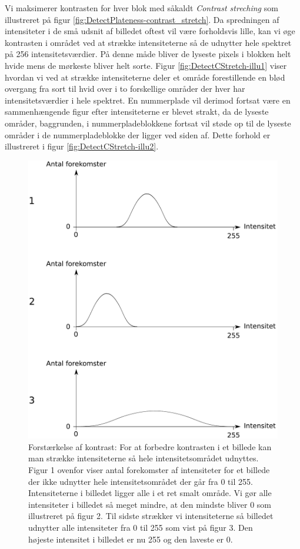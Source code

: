 Vi maksimerer kontrasten for hver blok med såkaldt \textit{Contrast streching} som illustreret på figur \vref{fig:DetectPlateness-contrast_stretch}. Da spredningen af intensiteter i de små udsnit af billedet oftest vil være forholdsvis lille, kan vi øge kontrasten i området ved at strække intensiteterne så de udnytter hele spektret på 256 intensitetsværdier. På denne måde bliver de lyseste pixels i blokken helt hvide  mens de mørkeste bliver helt sorte. Figur \vref{fig:DetectCStretch-illu1} viser hvordan vi ved at strække intensiteterne deler et område forestillende en blød overgang fra sort til hvid over i to forskellige områder der hver har intensitetsværdier i hele spektret. En nummerplade vil derimod fortsat være en sammenhængende figur efter intensiteterne er blevet strakt, da de lyseste områder, baggrunden, i nummerpladeblokkene fortsat vil støde op til de lyseste områder i de nummerpladeblokke der ligger ved siden af. Dette forhold er illustreret i figur \vref{fig:DetectCStretch-illu2}.


\begin{figure}[htp]
  \centering
  \includegraphics[width=12cm]{system/illu/contrast_stretch.pdf} 
  \caption{Forstærkelse af kontrast: For at forbedre kontrasten i et billede kan man strække intensiteterne så hele intensitetsområdet udnyttes. Figur 1 ovenfor viser antal forekomster  af intensiteter for et billede der ikke udnytter hele intensitetsområdet der går fra 0 til 255. Intensiteterne i billedet ligger alle i et ret smalt område. Vi gør alle intensiteter i billedet så meget mindre, at den mindste bliver 0 som illustreret på figur 2. Til sidste strækker vi intensiteterne så billedet udnytter alle intensiteter fra 0 til 255 som vist på figur 3. Den højeste intensitet i billedet er nu 255 og den laveste er 0.}
  \label{fig:DetectPlateness-contrast_stretch}
\end{figure}


